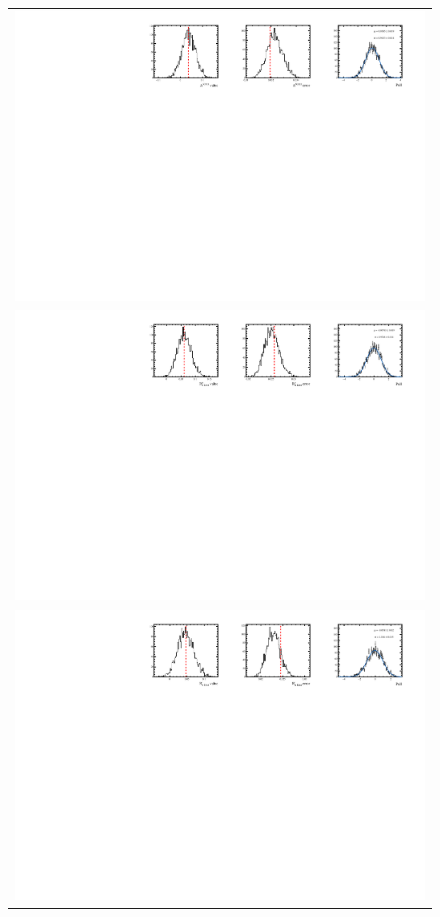 \begin{figure}
  \centering
  \begin{tabular}{c}
\includegraphics[width=\textwidth]{ANA_resources/Plots/Data_fit/FitterBias//CombinedRuns//A_signal_Kpipipi.pdf} \\
\includegraphics[width=\textwidth]{ANA_resources/Plots/Data_fit/FitterBias//CombinedRuns//R_signal_piKpipi_plus.pdf} \\
\includegraphics[width=\textwidth]{ANA_resources/Plots/Data_fit/FitterBias//CombinedRuns//R_signal_piKpipi_minus.pdf} \\

\end{tabular}
\end{figure}
